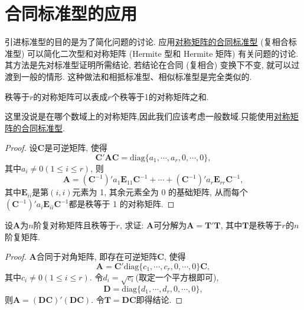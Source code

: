 \documentclass[../../main.tex]{subfiles}%
\begin{document}
\section{合同标准型的应用}

引进标准型的目的是为了简化问题的讨论. 应用\hyperref[theorem:对称矩阵的合同标准型]{对称矩阵的合同标准型} (复相合标准型) 可以简化二次型和对称矩阵 (Hermite 型和 Hermite 矩阵) 有关问题的讨论. 其方法是先对标准型证明所需结论, 若结论在合同 (复相合) 变换下不变, 就可以过渡到一般的情形. 这种做法和相抵标准型、相似标准型是完全类似的.

\begin{proposition}[对称矩阵的秩1分解]\label{proposition:对称矩阵的秩1分解}
秩等于$r$的对称矩阵可以表成$r$个秩等于1的对称矩阵之和.
\end{proposition}
\begin{remark}
这里没说是在哪个数域上的对称矩阵,因此我们应该考虑一般数域.只能使用\hyperref[theorem:对称矩阵的合同标准型]{对称矩阵的合同标准型}.
\end{remark}
\begin{proof}

设$\boldsymbol{C}$是可逆矩阵, 使得
\[
\boldsymbol{C}'\boldsymbol{A}\boldsymbol{C}=\text{diag}\{a_1, \cdots, a_r, 0, \cdots, 0\},
\]
其中$a_i\neq 0 (1\leqslant  i\leqslant  r)$, 则
\[
\boldsymbol{A}=(\boldsymbol{C}^{-1})'a_1\boldsymbol{E}_{11}\boldsymbol{C}^{-1}+\cdots+(\boldsymbol{C}^{-1})'a_r\boldsymbol{E}_{rr}\boldsymbol{C}^{-1},
\]
其中$\boldsymbol{E}_{ii}$是第$(i, i)$元素为 1, 其余元素全为 0 的基础矩阵, 从而每个$(\boldsymbol{C}^{-1})'a_i\boldsymbol{E}_{ii}\boldsymbol{C}^{-1}$都是秩等于 1 的对称矩阵. 

\end{proof}

\begin{proposition}\label{proposition:复对称阵都可分解成相同秩的复矩阵与其转置的乘积}
设$\boldsymbol{A}$为$n$阶复对称矩阵且秩等于$r$, 求证: $\boldsymbol{A}$可分解为$\boldsymbol{A}=\boldsymbol{T}'\boldsymbol{T}$, 其中$\boldsymbol{T}$是秩等于$r$的$n$阶复矩阵.
\end{proposition}
\begin{proof}

$\boldsymbol{A}$合同于对角矩阵, 即存在可逆矩阵$\boldsymbol{C}$, 使得
\[
\boldsymbol{A}=\boldsymbol{C}'\text{diag}\{c_1, \cdots, c_r, 0, \cdots, 0\}\boldsymbol{C},
\]
其中$c_i\neq 0 (1\leqslant  i\leqslant  r)$. 令$d_i = \sqrt{c_i}$(取定一个平方根即可),
\[
\boldsymbol{D}=\text{diag}\{d_1, \cdots, d_r, 0, \cdots, 0\},
\]
则$\boldsymbol{A}=(\boldsymbol{D}\boldsymbol{C})'(\boldsymbol{D}\boldsymbol{C})$. 令$\boldsymbol{T}=\boldsymbol{D}\boldsymbol{C}$即得结论. 

\end{proof}
\end{document}
